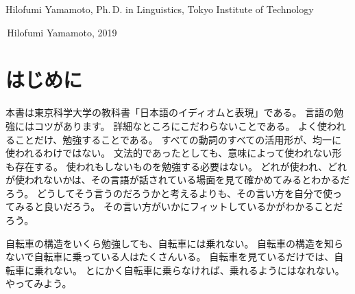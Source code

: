 \documentclass[
uplatex,
b5paper,
10pt,
dvipdfmx
]{jsbook}
\newif\ifEnglish
\newif\ifPreface
\begin{document}
Hilofumi Yamamoto, Ph.\,D. in Linguistics, Tokyo Institute of Technology

\textcopyright\,Hilofumi Yamamoto, 2019


\ifPreface
\ifEnglish
\chapter*{Preface}
This book is one of the textbooks used in Institute of Science Tokyo’ ``Idiom Expressions in Japanese.''

There is a knack to learning languages.  
Do not get caught up in the details.  
Focus on expressions that are actually used in daily life.  
Not all conjugations of all verbs are used evenly.  
Even if a form is grammatically correct, some forms are never used in real communication because of their meaning.  
You do not need to study what is not used.

You can see which forms are used and which are not by observing real situations where the language is spoken.  
Rather than wondering *why* something is said in a particular way, try using it yourself.  
You will feel how naturally it fits.

No matter how much you study the structure of a bicycle, you will never learn to ride one.  
Many people can ride a bicycle without knowing anything about its structure.  
Just looking at a bicycle will not teach you to ride.  
The only way to learn is to actually ride it.  
So, let's try.
\else
\chapter*{はじめに}

本書は東京科学大学の教科書「日本語のイディオムと表現」である。
言語の勉強にはコツがあります。
詳細なところにこだわらないことである。
よく使われることだけ、勉強することである。
すべての動詞のすべての活用形が、均一に使われるわけではない。
文法的であったとしても、意味によって使われない形も存在する。
使われもしないものを勉強する必要はない。
どれが使われ、どれが使われないかは、その言語が話されている場面を見て確かめてみるとわかるだろう。
どうしてそう言うのだろうかと考えるよりも、その言い方を自分で使ってみると良いだろう。
その言い方がいかにフィットしているかがわかることだろう。

自転車の構造をいくら勉強しても、自転車には乗れない。
自転車の構造を知らないで自転車に乗っている人はたくさんいる。
自転車を見ているだけでは、自転車に乗れない。
とにかく自転車に乗らなければ、乗れるようにはなれない。
やってみよう。
\fi
\end{document}
